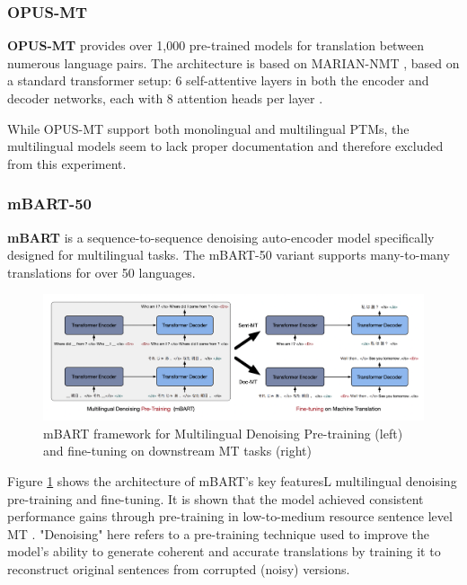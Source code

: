 \documentclass[a4paper]{article}
\begin{document}
\subsubsection{OPUS-MT}

\textbf{OPUS-MT} \cite{tiedemann-2023-democratizing,tiedemann-2020-opus-mt} provides over 1,000 pre-trained models for translation between numerous language pairs. The architecture is based on MARIAN-NMT \cite{mariannmt}, based on a standard transformer setup: 6 self-attentive layers in both the encoder and decoder networks, each with 8 attention heads per layer \cite{tiedemann-2020-opus-mt}.

While OPUS-MT support both monolingual and multilingual PTMs, the multilingual models seem to lack proper documentation and therefore excluded from this experiment.

\subsubsection{mBART-50}

\textbf{mBART} \cite{liu-2020-mbart} is a sequence-to-sequence denoising auto-encoder model specifically designed for multilingual tasks. The mBART-50 variant supports many-to-many translations for over 50 languages.

\begin{figure}[htbp]
    \centering
    \includegraphics[width=0.9\linewidth]{images/mbart.png}
    \caption{mBART framework for Multilingual Denoising Pre-training (left) and fine-tuning on downstream MT tasks
        (right) \cite{liu-2020-mbart}}
    \label{fig:mbart}
\end{figure}

Figure \ref{fig:mbart} shows the architecture of mBART's key featuresL multilingual denoising pre-training and fine-tuning. It is shown that the model achieved consistent performance gains through pre-training in low-to-medium resource sentence level MT \cite{liu-2020-mbart}. "Denoising" here refers to a pre-training technique used to improve the model's ability to generate coherent and accurate translations by training it to reconstruct original sentences from corrupted (noisy) versions.
\end{document}
